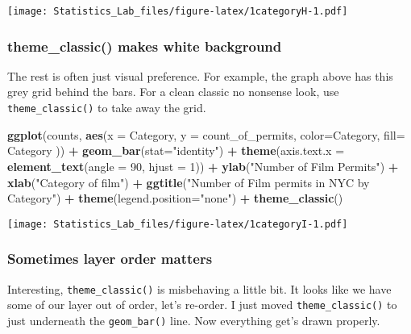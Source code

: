 \documentclass[
]{book}
\newenvironment{Shaded}{\begin{snugshade}}{\end{snugshade}}
\newcommand{\AttributeTok}[1]{\textcolor[rgb]{0.13,0.29,0.53}{#1}}
\newcommand{\DecValTok}[1]{\textcolor[rgb]{0.00,0.00,0.81}{#1}}
\newcommand{\FunctionTok}[1]{\textcolor[rgb]{0.13,0.29,0.53}{\textbf{#1}}}
\newcommand{\NormalTok}[1]{#1}
\newcommand{\SpecialCharTok}[1]{\textcolor[rgb]{0.81,0.36,0.00}{\textbf{#1}}}
\newcommand{\StringTok}[1]{\textcolor[rgb]{0.31,0.60,0.02}{#1}}
\begin{document}
\texttt{[image: Statistics\_Lab\_files/figure-latex/1categoryH-1.pdf]}

\hypertarget{theme_classic-makes-white-background}{%
\subsubsection{theme\_classic() makes white background}\label{theme_classic-makes-white-background}}

The rest is often just visual preference. For example, the graph above has this grey grid behind the bars. For a clean classic no nonsense look, use \texttt{theme\_classic()} to take away the grid.

\begin{Shaded}
\begin{Highlighting}[]
\FunctionTok{ggplot}\NormalTok{(counts, }\FunctionTok{aes}\NormalTok{(}\AttributeTok{x =}\NormalTok{ Category, }\AttributeTok{y =}\NormalTok{ count\_of\_permits, }
                   \AttributeTok{color=}\NormalTok{Category, }
                   \AttributeTok{fill=}\NormalTok{ Category )) }\SpecialCharTok{+}
  \FunctionTok{geom\_bar}\NormalTok{(}\AttributeTok{stat=}\StringTok{"identity"}\NormalTok{) }\SpecialCharTok{+} 
  \FunctionTok{theme}\NormalTok{(}\AttributeTok{axis.text.x =} \FunctionTok{element\_text}\NormalTok{(}\AttributeTok{angle =} \DecValTok{90}\NormalTok{, }\AttributeTok{hjust =} \DecValTok{1}\NormalTok{)) }\SpecialCharTok{+}
  \FunctionTok{ylab}\NormalTok{(}\StringTok{"Number of Film Permits"}\NormalTok{) }\SpecialCharTok{+} 
  \FunctionTok{xlab}\NormalTok{(}\StringTok{"Category of film"}\NormalTok{) }\SpecialCharTok{+}
  \FunctionTok{ggtitle}\NormalTok{(}\StringTok{"Number of Film permits in NYC by Category"}\NormalTok{) }\SpecialCharTok{+}
  \FunctionTok{theme}\NormalTok{(}\AttributeTok{legend.position=}\StringTok{"none"}\NormalTok{) }\SpecialCharTok{+}
  \FunctionTok{theme\_classic}\NormalTok{()}
\end{Highlighting}
\end{Shaded}

\texttt{[image: Statistics\_Lab\_files/figure-latex/1categoryI-1.pdf]}

\hypertarget{sometimes-layer-order-matters}{%
\subsubsection{Sometimes layer order matters}\label{sometimes-layer-order-matters}}

Interesting, \texttt{theme\_classic()} is misbehaving a little bit. It looks like we have some of our layer out of order, let's re-order. I just moved \texttt{theme\_classic()} to just underneath the \texttt{geom\_bar()} line. Now everything get's drawn properly.
\end{document}
